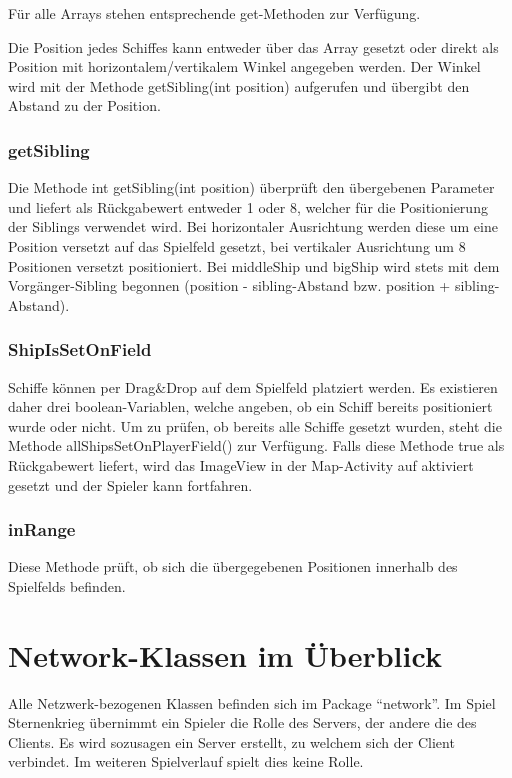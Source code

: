 \documentclass[11pt]{article} %
\begin{document}
Für alle Arrays stehen entsprechende get-Methoden zur Verfügung.

Die Position jedes Schiffes kann entweder über das Array gesetzt oder direkt als Position mit horizontalem/vertikalem Winkel angegeben werden. Der Winkel wird mit der Methode getSibling(int position) aufgerufen und übergibt den Abstand zu der Position.

\subsubsection{getSibling}
Die Methode int getSibling(int position) überprüft den übergebenen Parameter und liefert als Rückgabewert entweder 1 oder 8, welcher für die Positionierung der Siblings verwendet wird. Bei horizontaler Ausrichtung werden diese um eine Position versetzt auf das Spielfeld gesetzt, bei vertikaler Ausrichtung um 8 Positionen versetzt positioniert. Bei middleShip und bigShip wird stets mit dem Vorgänger-Sibling begonnen (position - sibling-Abstand bzw. position + sibling-Abstand).

\subsubsection{ShipIsSetOnField}
Schiffe können per Drag\&Drop auf dem Spielfeld platziert werden. Es existieren daher drei boolean-Variablen, welche angeben, ob ein Schiff bereits positioniert wurde oder nicht. Um zu prüfen, ob bereits alle Schiffe gesetzt wurden, steht die Methode allShipsSetOnPlayerField() zur Verfügung. Falls diese Methode true als Rückgabewert liefert, wird das ImageView in der Map-Activity auf aktiviert gesetzt und der Spieler kann fortfahren.

\subsubsection{inRange}
Diese Methode prüft, ob sich die übergegebenen Positionen innerhalb des Spielfelds befinden.

\section{Network-Klassen im Überblick}
Alle Netzwerk-bezogenen Klassen befinden sich im Package \enquote{network}. Im Spiel Sternenkrieg übernimmt ein Spieler die Rolle des Servers, der andere die des Clients. Es wird sozusagen ein Server erstellt, zu welchem sich der Client verbindet. Im weiteren Spielverlauf spielt dies keine Rolle.
\end{document}
